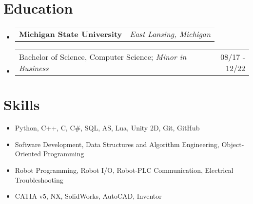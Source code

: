\documentclass[letterpaper,11pt,roman]{article}
\makeatletter
\newcommand{\resumeItem}[1]{
  \item\small{
    {#1}\vspace{-2pt}
  }
}
\newcommand{\resumeSubHeading}[2]{
  \vspace{-1pt}\item
    \begin{tabular*}{0.97\textwidth}{l@{\extracolsep{\fill}}r}
      \textbf{#1} & \textit{#2} \\
    \end{tabular*}\vspace{-5pt}
}
\newcommand{\resumeTitle}[2]{
  \vspace{-1pt}\item
    \begin{tabular*}{0.97\textwidth}{l@{\extracolsep{\fill}}r}
      \small#1 & {\small #2} \\
    \end{tabular*}\vspace{-5pt}
}
\newcommand{\resumeSubHeadingListStart}{\begin{itemize}[label=,leftmargin=]}
\newcommand{\resumeSubHeadingListEnd}{\end{itemize}}
\newcommand{\resumeItemListStart}{\begin{itemize}[label=$\circ$]}
\newcommand{\resumeItemListEnd}{\end{itemize}\vspace{-5pt}}
\makeatother
\begin{document}
\section{Education}
    \resumeSubHeadingListStart
        \resumeSubHeading{Michigan State University}{East Lansing, Michigan}
            \resumeTitleListStart
                \resumeTitle{Bachelor of Science, Computer Science; \textit{Minor in Business}}{08/17 - 12/22}
            \resumeTitleListEnd
        \resumeSubHeadingListEnd

  
\section{Skills}
    \resumeItemListStart
        \resumeItem{Python, C++, C, C\#, SQL, AS, Lua, Unity 2D, Git, GitHub}
        \resumeItem{Software Development, Data Structures and Algorithm Engineering, Object-Oriented Programming}
        \resumeItem{Robot Programming, Robot I/O, Robot-PLC Communication, Electrical Troubleshooting}
        \resumeItem{CATIA v5, NX, SolidWorks, AutoCAD, Inventor}
    \resumeItemListEnd
\end{document}
